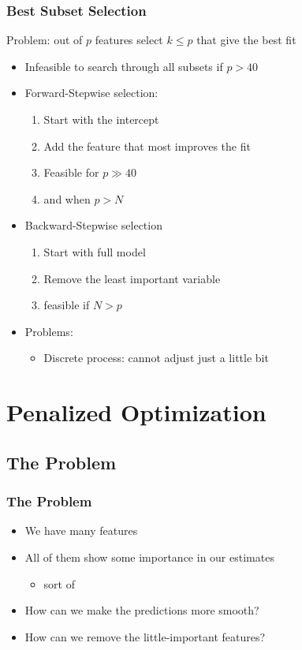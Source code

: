 \documentclass[mathserif, xcolor=table, svgnames]{beamer}
\begin{document}
\begin{frame}
  \frametitle{Best Subset Selection}
  Problem: out of $p$ features select $k \le p$ that give the best fit
  \begin{itemize}
  \item Infeasible to search through all subsets if $p > 40$
  \item Forward-Stepwise selection:
    \begin{enumerate}
    \item Start with the intercept
    \item Add the feature that most improves the fit
    \item[] Feasible for $p \gg 40$
    \item[] and when $p > N$
    \end{enumerate}
  \item Backward-Stepwise selection
    \begin{enumerate}
    \item Start with full model
    \item Remove the least important variable
    \item[] feasible if $N > p$
    \end{enumerate}
  \item Problems:
    \begin{itemize}
    \item Discrete process: cannot adjust just a little bit
    \end{itemize}
  \end{itemize}
\end{frame}

\section{Penalized Optimization}

\subsection{The Problem}
\frame{\tableofcontents[currentsubsection]}

\begin{frame}
  \frametitle{The Problem}
  \begin{itemize}
  \item We have many features
  \item All of them show some importance in our estimates
    \begin{itemize}
    \item sort of
    \end{itemize}
  \item How can we make the predictions more smooth?
  \item How can we remove the little-important features?
  \end{itemize}
\end{frame}
\end{document}
